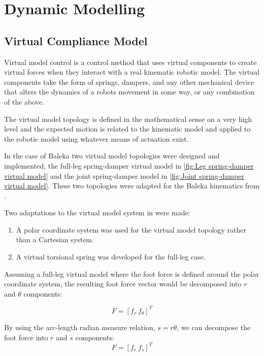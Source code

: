 \chapter{Dynamic Modelling}
\label{chap:Dynamic Modelling}

\section{Virtual Compliance Model}
\label{sec:Virtual Compliance Model}

Virtual model control is a control method that uses virtual components to create virtual forces when they interact with a real kinematic robotic model.\cite{Pratt2001} The virtual components take the form of springs, dampers, and any other mechanical device that alters the dynamics of a robots movement in some way, or any combination of the above. 

The virtual model topology is defined in the mathematical sense on a very high level and the expected motion is related to the kinematic model and applied to the robotic model using whatever means of actuation exist. 

In the case of Baleka two virtual model topologies were designed and implemented, the full-leg spring-damper virtual model in \cref{fig:Leg spring-damper virtual model} and the joint spring-damper model in \cref{fig:Joint spring-damper virtual model}. These two topologies were adapted for the Baleka kinematics from \cite{Kalouche2016}. 

Two adaptations to the virtual model system in \cite{Kalouche2016} were made:
\begin{enumerate}
\item A polar coordinate system was used for the virtual model topology rather than a Cartesian system.
\item A virtual torsional spring was developed for the full-leg case. 
\end{enumerate}

Assuming a full-leg virtual model where the foot force is defined around the polar coordinate system, the resulting foot force vector would be decomposed into $r$ and $\theta$ components: 

\begin{equation}
F = [f_r\ f_{\theta}]^T
\end{equation}

By using the arc-length radian measure relation, $s = r \theta$, we can decompose the foot force into $r$ and $s$ components: 
\begin{equation}
F = [f_r\ f_{s}]^T
\end{equation}

